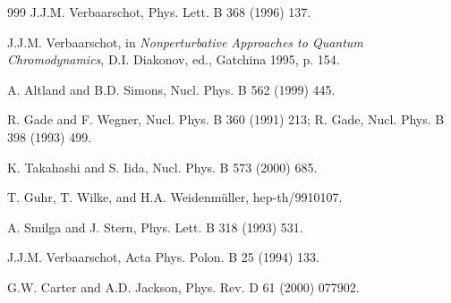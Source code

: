\begin{thebibliography}{999}
      J.J.M. Verbaarschot, 
                      Phys. Lett. B 368 (1996) 137.         %

      J.J.M. Verbaarschot,
                      in {\it Nonperturbative Approaches to Quantum
                      Chromodynamics}, D.I. Diakonov, ed., Gatchina
                      1995, p. 154.

 A. Altland and B.D. Simons,
                      Nucl. Phys. B 562 (1999) 445.         %

        R. Gade and F. Wegner, 
                      Nucl. Phys. B 360 (1991) 213;         %
                      R. Gade, 
                      Nucl. Phys. B 398 (1993) 499.         %

   K. Takahashi and S. Iida,
                      Nucl. Phys. B 573 (2000) 685.

 T. Guhr, T. Wilke, and H.A. Weidenm\"uller,
                      hep-th/9910107.                        %

   A. Smilga and J. Stern, 
                      Phys. Lett. B 318 (1993) 531.          %

        J.J.M. Verbaarschot, 
                      Acta Phys. Polon. B 25 (1994) 133.     %

      G.W. Carter and A.D. Jackson,
                      Phys. Rev. D 61 (2000) 077902.


\end{thebibliography}
